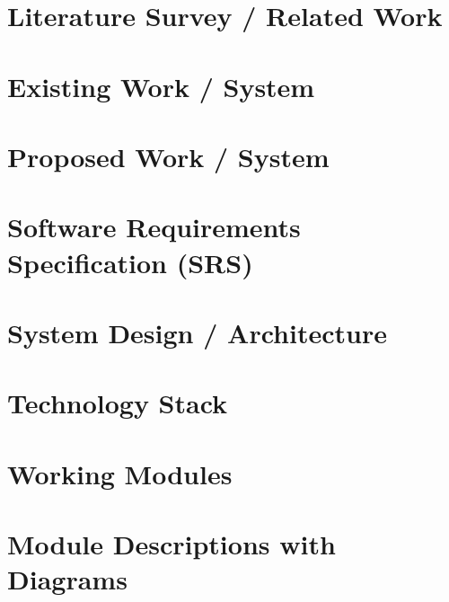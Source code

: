 \documentclass[13pt,letterpaper]{article}
\begin{document}
\section{Literature Survey / Related Work}

\section{Existing Work / System}

\section{Proposed Work / System}

\section{Software Requirements Specification (SRS)}

\section{System Design / Architecture}

\section{Technology Stack}

\section{Working Modules}

\section{Module Descriptions with Diagrams}
\end{document}
